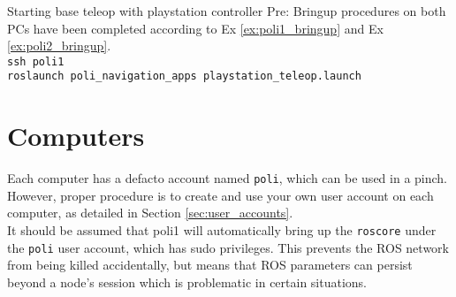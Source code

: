 \begin{example}{Starting base teleop with playstation controller}
  \label{ex:base_teleop}
    Pre: Bringup procedures on both PCs have been completed according to Ex \ref{ex:poli1_bringup} and Ex \ref{ex:poli2_bringup}. \\
    \texttt{ssh poli1} \\ 
    \texttt{roslaunch poli\_navigation\_apps playstation\_teleop.launch} \\

\end{example}


\section{Computers}
Each computer has a defacto account named \texttt{poli}, which can be used in a pinch. 
However, proper procedure is to create and use your own user account on each computer, as detailed in Section \ref{sec:user_accounts}. \\

It should be assumed that poli1 will automatically bring up the \texttt{roscore} under the \texttt{poli} user account, which has sudo privileges. 
This prevents the ROS network from being killed accidentally, but means that ROS parameters can persist beyond a node's session which is problematic in certain situations. \\


